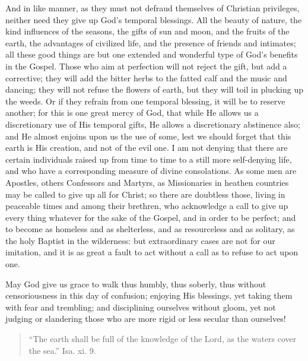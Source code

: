 And in like manner, as they must not defraud themselves of
Christian privileges, neither need they give up God's temporal
blessings. All the beauty of nature, the kind influences of the
seasons, the gifts of sun and moon, and the fruits of the earth, the
advantages of civilized life, and the presence of friends and
intimates; all these good things are but one extended and wonderful
type of God's benefits in the Gospel. Those who aim at perfection will
not reject the gift, but add a corrective; they will add the bitter
herbs to the fatted calf and the music and dancing; they will not
refuse the flowers of earth, but they will toil in plucking up the
weeds. Or if they refrain from one temporal blessing, it will be to
reserve another; for this is one great mercy of God, that while He
allows us a discretionary use of His temporal gifts, He allows a
discretionary abstinence also; and He almost enjoins upon us the use
of some, lest we should forget that this earth is His creation, and
not of the evil one. I am not denying that there are certain
individuals raised up from time to time to a still more self-denying
life, and who have a corresponding measure of divine consolations. As
some men are Apostles, others Confessors and Martyrs, as Missionaries
in heathen countries may be called to give up all for Christ; so there
are doubtless those, living in peaceable times and among their
brethren, who acknowledge a call to give up every thing whatever for
the sake of the Gospel, and in order to be perfect; and to become as
homeless and as shelterless, and as resourceless and as solitary, as
the holy Baptist in the wilderness: but extraordinary cases are not
for our imitation, and it is as great a fault to act without a call as
to refuse to act upon one.

May God give us grace to walk thus humbly, thus soberly, thus
without censoriousness in this day of confusion; enjoying His
blessings, yet taking them with fear and trembling; and disciplining
ourselves without gloom, yet not judging or slandering those who are
more rigid or less secular than ourselves!


\begin{quote}

``The earth shall be full of the knowledge of the Lord, as
the waters cover the sea.'' Isa. xi. 9.

\end{quote}

